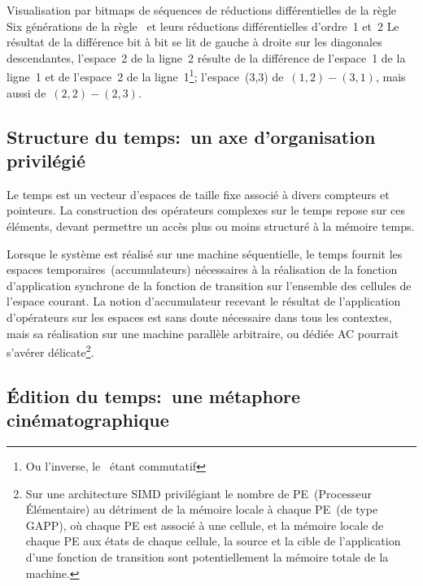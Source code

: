 %
{Visualisation par bitmaps de séquences de réductions dif\-férentiel\-les
  de la règle~}%
{Six générations de la règle~ et leurs réductions dif\-fé\-ren\-tiel\-les
  d'ordre~1 et~2}%
{Le résultat de la différence bit à bit se lit de gauche à droite sur
  les diagonales descendantes, l'espace~2 de la ligne~2 résulte de la
  différence de l'espace~1 de la ligne~1 et de l'espace~2 de la
  ligne~1\footnote{%
    Ou l'inverse, le \xor\ étant commutatif};
  l'espace~(3,3) de~$(1,2)-(3,1)$, mais aussi de~$(2,2)-(2,3)$.}

\subsection{Structure du temps:~un axe d'organisation privilégié}

Le temps est un vecteur d'espaces de taille fixe associé à divers
compteurs et pointeurs. %
La construction des opérateurs complexes sur le temps repose sur ces
éléments, devant permettre un accès plus ou moins structuré à la
mémoire temps. %

Lorsque le système est réalisé sur une machine séquentielle, le temps
fournit les espaces temporaires~(accumulateurs) nécessaires à la
réalisation de la fonction d'application synchrone de la fonction de
transition sur l'ensemble des cellules de l'espace courant. %
La notion d'accumulateur recevant le résultat de l'application
d'opérateurs sur les espaces est sans doute nécessaire dans tous les
contextes, mais sa réalisation sur une machine parallèle arbitraire,
ou dédiée AC pourrait s'avérer délicate\footnote{%
  Sur une architecture SIMD privilégiant le nombre de PE~(Processeur
  Élémentaire) au détriment de la mémoire locale à chaque PE~(de type
  GAPP), où chaque PE est associé à une cellule, et la mémoire locale
  de chaque PE aux états de chaque cellule, la source et la cible de
  l'application d'une fonction de transition sont potentiellement la
  mémoire totale de la machine.}. %

\subsection{Édition du temps:~une métaphore cinématogra\-phique}

